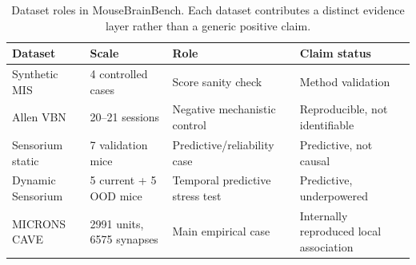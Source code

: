 \begin{table}[t]
\centering
\caption{Dataset roles in MouseBrainBench. Each dataset contributes a distinct evidence layer rather than a generic positive claim.}
\label{tab:dataset-roles}
\small
\begin{tabularx}{\textwidth}{l l X X}
\toprule
Dataset & Scale & Role & Claim status \\
\midrule
Synthetic MIS & 4 controlled cases & Score sanity check & Method validation \\
Allen VBN & 20--21 sessions & Negative mechanistic control & Reproducible, not identifiable \\
Sensorium static & 7 validation mice & Predictive/reliability case & Predictive, not causal \\
Dynamic Sensorium & 5 current + 5 OOD mice & Temporal predictive stress test & Predictive, underpowered \\
MICRONS CAVE & 2991 units, 6575 synapses & Main empirical case & Internally reproduced local association \\
\bottomrule
\end{tabularx}
\end{table}

